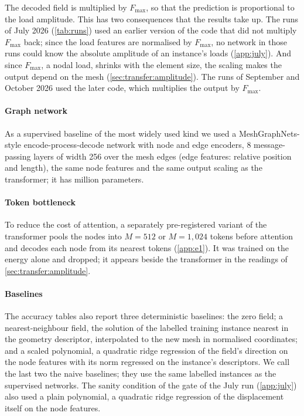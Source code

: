 The decoded field is multiplied by $F_{\max}$, so that the prediction is proportional to the
load amplitude. This has two consequences that the results take up. The runs of July 2026
(\cref{tab:runs}) used an earlier version of the code that did not multiply $F_{\max}$
back; since the load features are normalised by $F_{\max}$, no network in those runs could
know the absolute amplitude of an instance's loads (\ref{app:july}). And since $F_{\max}$,
a nodal load, shrinks with the element size, the scaling makes the output depend on the
mesh (\cref{sec:transfer:amplitude}). The runs of September and October 2026 used the later
code, which multiplies the output by $F_{\max}$.

\paragraph{Graph network}
As a supervised baseline of the most widely used kind we used a MeshGraphNets-style
encode-process-decode network \cite{Pfaff2021} with node and edge encoders, 8
message-passing layers of width 256 over the mesh edges (edge features: relative position
and length), the same node features and the same output scaling as the transformer;
it has \numParamsGraph{} million parameters.

\paragraph{Token bottleneck}
To reduce the cost of attention, a separately pre-registered variant of the transformer
pools the nodes into $M=512$ or $M=1{,}024$ tokens before attention and decodes each node
from its nearest tokens (\ref{app:e1}). It was trained on the energy alone and dropped; it
appears beside the transformer in the readings of \cref{sec:transfer:amplitude}.

\paragraph{Baselines}
The accuracy tables also report three deterministic baselines: the zero field; a
nearest-neighbour field, the solution of the labelled training instance nearest in the
geometry descriptor, interpolated to the new mesh in normalised coordinates; and a scaled
polynomial, a quadratic ridge regression of the field's direction on the node features with
its norm regressed on the instance's descriptors. We call the last two the naive baselines;
they use the same labelled instances as the supervised networks. The sanity condition of
the gate of the July run (\ref{app:july}) also used a plain polynomial, a quadratic ridge
regression of the displacement itself on the node features.

